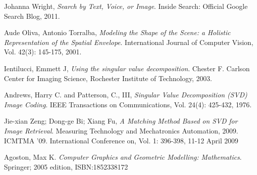 \documentclass{report}
\begin{document}
\begin{thebibliography}{6}

  Johanna Wright,
  \emph{Search by Text, Voice, or Image}.
  Inside Search: Official Google Search Blog,
  2011.
  
  Aude Oliva, Antonio Torralba,
  \emph{	Modeling the Shape of the Scene: a Holistic Representation of the Spatial Envelope}.
  International Journal of Computer Vision, 
  Vol. 42(3): 145-175, 
  2001.

  Ientilucci, Emmett J,
  \emph{Using the singular value decomposition}. 
  Chester F. Carlson Center for Imaging Science,
  Rochester Institute of Technology,
  2003.

  Andrews, Harry C. and Patterson, C., III,
  \emph{ Singular Value Decomposition (SVD) Image Coding}.
  IEEE Transactions on Communications,
  Vol. 24(4): 425-432,
  1976.

  Jie-xian Zeng; Dong-ge Bi; Xiang Fu,
  \emph{A Matching Method Based on SVD for Image Retrieval}.
  Measuring Technology and Mechatronics Automation, 2009. ICMTMA '09. International Conference on, 
  Vol. 1: 396-398, 
  11-12 April 2009
  
  Agoston, Max K.
  \emph{Computer Graphics and Geometric Modelling: Mathematics}.
  Springer; 2005 edition,
  ISBN:1852338172

\end{thebibliography}
\end{document}
